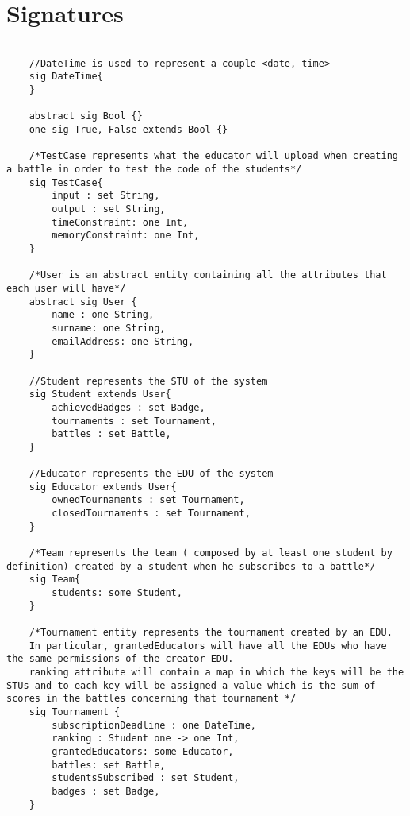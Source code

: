 \section[Signatures]{Signatures}
\begin{lstlisting}[language=Alloy,  label={lst:alloycode}, basicstyle=\fontfamily{Roboto}\selectfont\ttfamily]
        
    //DateTime is used to represent a couple <date, time>
    sig DateTime{
    }

    abstract sig Bool {}
    one sig True, False extends Bool {}

    /*TestCase represents what the educator will upload when creating a battle in order to test the code of the students*/
    sig TestCase{
        input : set String,
        output : set String,
        timeConstraint: one Int,
        memoryConstraint: one Int,
    }

    /*User is an abstract entity containing all the attributes that each user will have*/ 
    abstract sig User {
        name : one String,
        surname: one String,
        emailAddress: one String,
    }

    //Student represents the STU of the system
    sig Student extends User{
        achievedBadges : set Badge,
        tournaments : set Tournament,
        battles : set Battle,
    }

    //Educator represents the EDU of the system
    sig Educator extends User{
        ownedTournaments : set Tournament,
        closedTournaments : set Tournament,
    }
    
    /*Team represents the team ( composed by at least one student by definition) created by a student when he subscribes to a battle*/
    sig Team{
        students: some Student,
    }

    /*Tournament entity represents the tournament created by an EDU. 
    In particular, grantedEducators will have all the EDUs who have the same permissions of the creator EDU.
    ranking attribute will contain a map in which the keys will be the STUs and to each key will be assigned a value which is the sum of scores in the battles concerning that tournament */
    sig Tournament {
        subscriptionDeadline : one DateTime,
        ranking : Student one -> one Int,
        grantedEducators: some Educator,
        battles: set Battle,
        studentsSubscribed : set Student,
        badges : set Badge,
    }
    

\end{lstlisting}
